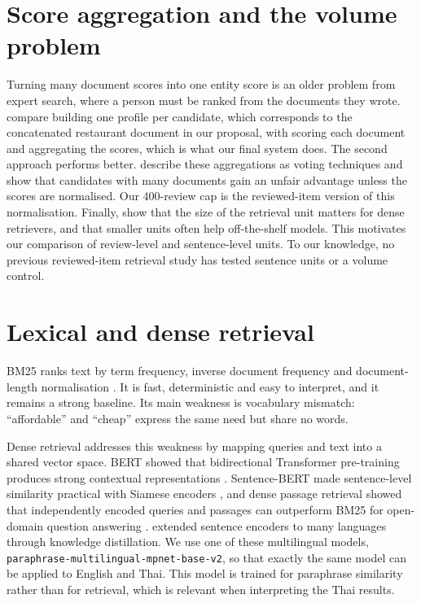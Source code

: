 \section{Score aggregation and the volume problem}
Turning many document scores into one entity score is an older problem from expert search,
where a person must be ranked from the documents they wrote. \citet{balog2006formal} compare
building one profile per candidate, which corresponds to the concatenated restaurant document
in our proposal, with scoring each document and aggregating the scores, which is what our final
system does. The second approach performs better. \citet{macdonald2008voting} describe these
aggregations as voting techniques and show that candidates with many documents gain an unfair
advantage unless the scores are normalised. Our 400-review cap is the reviewed-item version of
this normalisation. Finally, \citet{chen2024densex} show that the size of the retrieval unit
matters for dense retrievers, and that smaller units often help off-the-shelf models. This
motivates our comparison of review-level and sentence-level units. To our knowledge, no
previous reviewed-item retrieval study has tested sentence units or a volume control.

\section{Lexical and dense retrieval}
BM25 ranks text by term frequency, inverse document frequency and document-length
normalisation \citep{robertson2009bm25}. It is fast, deterministic and easy to interpret, and it
remains a strong baseline. Its main weakness is vocabulary mismatch: ``affordable'' and
``cheap'' express the same need but share no words.

Dense retrieval addresses this weakness by mapping queries and text into a shared vector
space. BERT showed that bidirectional Transformer pre-training produces strong contextual
representations \citep{devlin2019bert}. Sentence-BERT made sentence-level similarity practical
with Siamese encoders \citep{reimers2019sbert}, and dense passage retrieval showed that
independently encoded queries and passages can outperform BM25 for open-domain question
answering \citep{karpukhin2020dpr}. \citet{reimers2020multilingual} extended sentence encoders
to many languages through knowledge distillation. We use one of these multilingual models,
\texttt{paraphrase-multilingual-mpnet-base-v2}, so that exactly the same model can be applied to
English and Thai. This model is trained for paraphrase similarity rather than for retrieval,
which is relevant when interpreting the Thai results.

